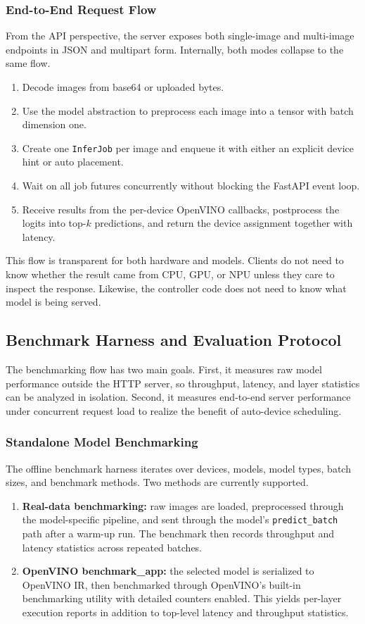 \documentclass[conference]{IEEEtran}
\begin{document}
\subsubsection{End-to-End Request Flow}
From the API perspective, the server exposes both single-image and multi-image endpoints in JSON and multipart form. Internally, both modes collapse to the same flow.

\begin{enumerate}
\item Decode images from base64 or uploaded bytes.
\item Use the model abstraction to preprocess each image into a tensor with batch dimension one.
\item Create one \texttt{InferJob} per image and enqueue it with either an explicit device hint or auto placement.
\item Wait on all job futures concurrently without blocking the FastAPI event loop.
\item Receive results from the per-device OpenVINO callbacks, postprocess the logits into top-\(k\) predictions, and return the device assignment together with latency.
\end{enumerate}

This flow is transparent for both hardware and models. Clients do not need to know whether the result came from CPU, GPU, or NPU unless they care to inspect the response. Likewise, the controller code does not need to know what model is being served.

\subsection{Benchmark Harness and Evaluation Protocol}
The benchmarking flow has two main goals. First, it measures raw model performance outside the HTTP server, so throughput, latency, and layer statistics can be analyzed in isolation. Second, it measures end-to-end server performance under concurrent request load to realize the benefit of auto-device scheduling.

\subsubsection{Standalone Model Benchmarking}
The offline benchmark harness iterates over devices, models, model types, batch sizes, and benchmark methods. Two methods are currently supported.

\begin{enumerate}
\item \textbf{Real-data benchmarking:} raw images are loaded, preprocessed through the model-specific pipeline, and sent through the model's \texttt{predict\_batch} path after a warm-up run. The benchmark then records throughput and latency statistics across repeated batches.
\item \textbf{OpenVINO benchmark\_app:} the selected model is serialized to OpenVINO IR, then benchmarked through OpenVINO's built-in benchmarking utility with detailed counters enabled. This yields per-layer execution reports in addition to top-level latency and throughput statistics.
\end{enumerate}
\end{document}
